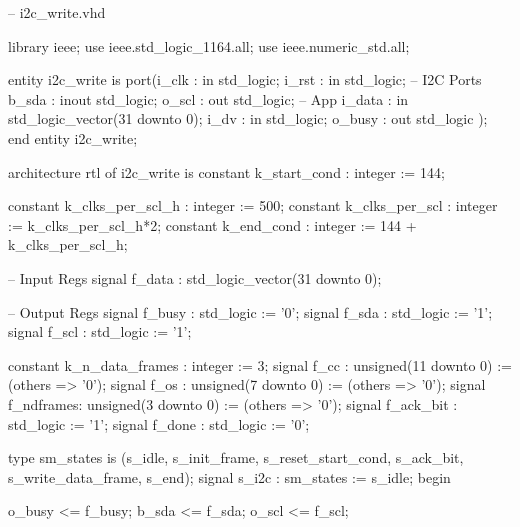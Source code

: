 \begin{VHDLlisting}[tabsize=4]
-- i2c_write.vhd

library ieee;
    use ieee.std_logic_1164.all;
    use ieee.numeric_std.all;


entity i2c_write is
    port(i_clk        : in    std_logic;
         i_rst        : in    std_logic;
         -- I2C Ports 
         b_sda        : inout std_logic;
         o_scl        :   out std_logic;
         -- App 
         i_data       : in    std_logic_vector(31 downto 0);
         i_dv         : in    std_logic;
         o_busy       :   out std_logic
    );
end entity i2c_write;

architecture rtl of i2c_write is 
    constant k_start_cond     : integer := 144;
	
    constant k_clks_per_scl_h : integer := 500;
    constant k_clks_per_scl   : integer := k_clks_per_scl_h*2;
    constant k_end_cond       : integer := 144 + k_clks_per_scl_h;
	
    -- Input Regs
    signal f_data    : std_logic_vector(31 downto 0);
    	
    -- Output Regs
    signal f_busy    : std_logic := '0';
    signal f_sda     : std_logic := '1';
    signal f_scl     : std_logic := '1';

    constant k_n_data_frames : integer := 3;
    signal f_cc      : unsigned(11 downto 0) := (others => '0');
    signal f_os      : unsigned(7 downto 0) := (others => '0');
    signal f_ndframes: unsigned(3 downto 0) := (others => '0');
    signal f_ack_bit : std_logic := '1';
    signal f_done    : std_logic := '0';

    type sm_states is (s_idle, 
                       s_init_frame, 
                       s_reset_start_cond, 
                       s_ack_bit, 
                       s_write_data_frame, 
                       s_end);
    signal s_i2c  : sm_states := s_idle;
begin

    o_busy <= f_busy;
    b_sda <= f_sda;
    o_scl <= f_scl;


\end{VHDLlisting}
